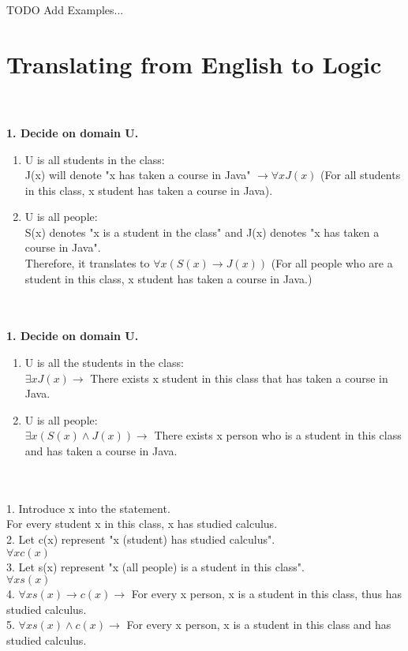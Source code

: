 \documentclass{article}
\begin{document}
TODO Add Examples...

\pagebreak
\section{Translating from English to Logic}
\\
\\
\textbf{1. Decide on domain U.}
\begin{enumerate}
    \item
    U is all students in the class:\\
    J(x) will denote "x has taken a course in Java" $\to \forall xJ(x)$ (For all students in this class, x student has taken a course in Java).\\

    \item
    U is all people:\\
    S(x) denotes "x is a student in the class" and J(x) denotes "x has taken a course in Java".\\
    Therefore, it translates to $\forall x(S(x)\to J(x))$ (For all people who are a student in this class, x student has taken a course in Java.)\\
\end{enumerate}

\\
\\
\textbf{1. Decide on domain U.}
\begin{enumerate}
    \item
    U is all the students in the class:\\
    $\exists xJ(x) \to$ There exists x student in this class that has taken a course in Java.
    \item
    U is all people:\\
    $\exists x(S(x)\wedge J(x)) \to$ There exists x person who is a student in this class and has taken a course in Java.\\
\end{enumerate}

\\
\\
1. Introduce x into the statement.\\
\indent For every student x in this class, x has studied calculus.\\
2. Let c(x) represent "x (student) has studied calculus".\\
\indent $\forall xc(x)$\\
3. Let s(x) represent "x (all people) is a student in this class".\\
\indent $\forall xs(x)$\\
4. $\forall xs(x) \to c(x) \to$ For every x person, x is a student in this class, thus has studied calculus.\\
5. $\forall xs(x)\wedge c(x) \to$ For every x person, x is a student in this class and has studied calculus.\\
\end{document}
